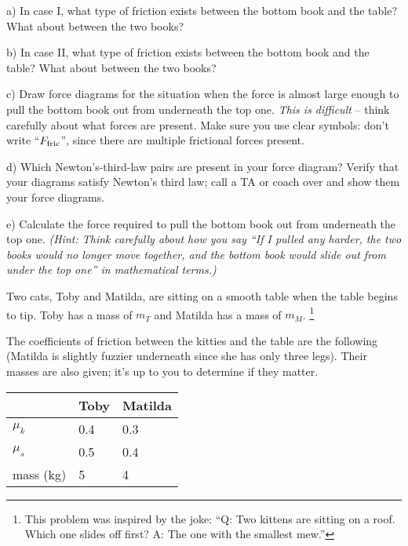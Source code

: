 \documentclass[12pt]{article}
\begin{document}
	a) In case I, what type of friction exists between the bottom book and the table? What about between the two books?
	
	\vspace{0.5in}
	
	b) In case II, what type of friction exists between the bottom book and the table? What about between the two books?
	
	\vspace{0.5in}
	
	c) Draw force diagrams for the situation when the force is almost large enough to pull the bottom book out from underneath the top one. {\it This is difficult} -- think carefully about what forces are present. Make sure you use clear symbols: don't write ``$F_{\rm fric}$'', since there are multiple frictional forces present.
	
	\vspace{2.3in}
	
	d) Which Newton's-third-law pairs are present in your force diagram? Verify that your diagrams satisfy Newton's third law; call a TA or coach over and show them your force diagrams.
	
	\newpage
	
	e) Calculate the force required to pull the bottom book out from underneath the top one. {\it (Hint: Think carefully about how you say ``If I pulled any harder, the two books would no longer move together, and the bottom book would slide out from under the top one'' in mathematical terms.)}
	
	\newpage
	
	Two cats, Toby and Matilda, are sitting on a smooth table when the table begins to tip. Toby has a mass of $m_T$ and Matilda has a mass of $m_M$. \footnote{This problem was inspired by the joke: ``Q: Two kittens are sitting on a roof. Which one slides off first? A: The one with the smallest mew.''}
	
	\begin{minipage}{0.6\textwidth}
		The coefficients of friction between the kitties and the table are the following (Matilda is slightly fuzzier underneath since she has only three legs). Their masses are also
		given; it's up to you to determine if they matter.
	\end{minipage}\hspace{0.1\textwidth}
	\begin{minipage}{0.3\textwidth}
		\begin{tabular}{|l|l|l|}
			\hline
			& Toby & Matilda \\ \hline
			$\mu_k$ & 0.4  & 0.3  \\ \hline
			$\mu_s$ & 0.5  & 0.4  \\ \hline
			mass (kg) & 5 & 4 \\ \hline
		\end{tabular}
	\end{minipage}
	
\end{document}
